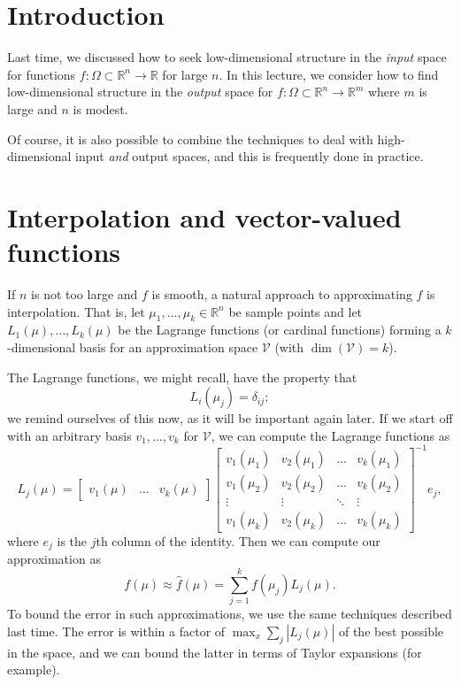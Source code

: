 \documentclass[12pt, leqno]{article} %
\begin{document}

\section{Introduction}

Last time, we discussed how to seek low-dimensional structure in the
{\em input} space for functions $f : \Omega \subset \mathbb{R}^n
\rightarrow \mathbb{R}$ for large $n$.  In this lecture, we consider
how to find low-dimensional structure in the {\em output} space for
$f : \Omega \subset \mathbb{R}^n \rightarrow \mathbb{R}^m$ where $m$ is
large and $n$ is modest.

Of course, it is also possible to combine the techniques to deal with
high-dimensional input {\em and} output spaces, and this is frequently
done in practice.

\section{Interpolation and vector-valued functions}

If $n$ is not too large and $f$ is smooth, a natural approach to
approximating $f$ is interpolation.  That is, let
$\mu_1, \ldots, \mu_k \in \mathbb{R}^n$ be sample points and let
$L_1(\mu), \ldots, L_k(\mu)$ be the Lagrange functions (or cardinal
functions) forming a $k$-dimensional basis for an approximation
space $\mathcal{V}$ (with $\dim(\mathcal{V}) = k$).

The Lagrange functions, we might recall, have the property that
\[
  L_i(\mu_j) = \delta_{ij};
\]
we remind ourselves of this now, as it will be important again later.
If we start off with an arbitrary basis $v_1, \ldots, v_k$ for
$\mathcal{V}$, we can compute the Lagrange functions as
\[
L_j(\mu) = 
  \begin{bmatrix} v_1(\mu) & \ldots & v_k(\mu) \end{bmatrix}
  \begin{bmatrix}
    v_1(\mu_1) & v_2(\mu_1) & \ldots & v_k(\mu_1) \\
    v_1(\mu_2) & v_2(\mu_2) & \ldots & v_k(\mu_2) \\
    \vdots & \vdots & \ddots & \vdots \\
    v_1(\mu_k) & v_2(\mu_k) & \ldots & v_k(\mu_k)
  \end{bmatrix}^{-1} e_j,
\]
where $e_j$ is the $j$th column of the identity.
Then we can compute our approximation as
\[
  f(\mu) \approx \hat{f}(\mu) = \sum_{j=1}^k f(\mu_j) L_j(\mu).
\]
To bound the error in such approximations, we use the same techniques
described last time.  The error is within a factor of $\max_x \sum_j
|L_j(\mu)|$ of the best possible in the space, and we can bound the
latter in terms of Taylor expansions (for example).
\end{document}
